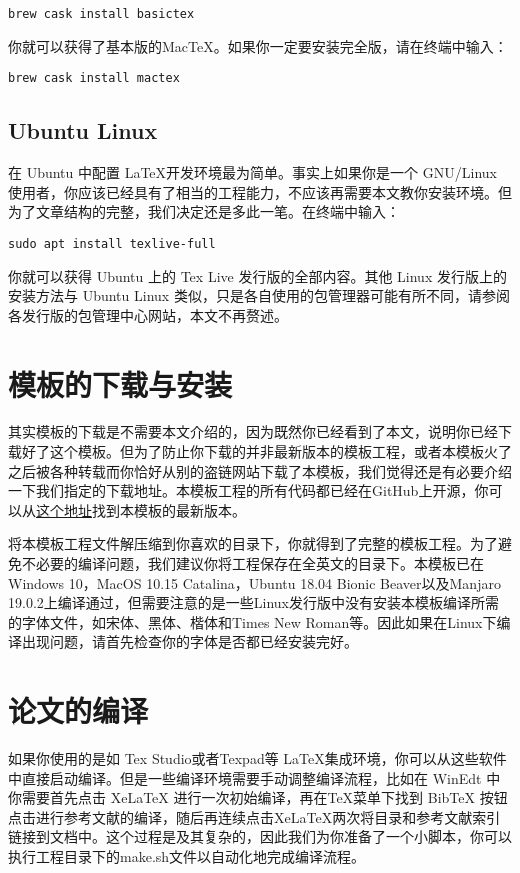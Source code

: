 \begin{tcolorbox}
\begin{lstlisting}
brew cask install basictex
\end{lstlisting}
\end{tcolorbox}

\noindent 你就可以获得了基本版的MacTeX。如果你一定要安装完全版，请在终端中输入：

\begin{tcolorbox}
\begin{lstlisting}
brew cask install mactex
\end{lstlisting}
\end{tcolorbox}

\subsection{Ubuntu Linux}

在 Ubuntu 中配置 \LaTeX 开发环境最为简单。事实上如果你是一个 GNU/Linux 使用者，你应该已经具有了相当的工程能力，不应该再需要本文教你安装环境。但为了文章结构的完整，我们决定还是多此一笔。在终端中输入：

\begin{tcolorbox}
\begin{lstlisting}
sudo apt install texlive-full
\end{lstlisting}
\end{tcolorbox}

\noindent 你就可以获得 Ubuntu 上的 Tex Live 发行版的全部内容。其他 Linux 发行版上的安装方法与 Ubuntu Linux 类似，只是各自使用的包管理器可能有所不同，请参阅各发行版的包管理中心网站，本文不再赘述。

\section{模板的下载与安装}
\label{sec:template_download}

其实模板的下载是不需要本文介绍的，因为既然你已经看到了本文，说明你已经下载好了这个模板。但为了防止你下载的并非最新版本的模板工程，或者本模板火了之后被各种转载而你恰好从别的盗链网站下载了本模板，我们觉得还是有必要介绍一下我们指定的下载地址。本模板工程的所有代码都已经在GitHub上开源，你可以从\href{https://github.com/herculas/SEU-master-thesis}{这个地址}找到本模板的最新版本。

将本模板工程文件解压缩到你喜欢的目录下，你就得到了完整的模板工程。为了避免不必要的编译问题，我们建议你将工程保存在全英文的目录下。本模板已在Windows 10，MacOS 10.15 Catalina，Ubuntu 18.04 Bionic Beaver以及Manjaro 19.0.2上编译通过，但需要注意的是一些Linux发行版中没有安装本模板编译所需的字体文件，如宋体、黑体、楷体和Times New Roman等。因此如果在Linux下编译出现问题，请首先检查你的字体是否都已经安装完好。

\section{论文的编译}
\label{sec:compilation}

如果你使用的是如 Tex Studio或者Texpad等 \LaTeX 集成环境，你可以从这些软件中直接启动编译。但是一些编译环境需要手动调整编译流程，比如在 WinEdt 中你需要首先点击 XeLaTeX 进行一次初始编译，再在TeX菜单下找到 BibTeX 按钮点击进行参考文献的编译，随后再连续点击XeLaTeX两次将目录和参考文献索引链接到文档中。这个过程是及其复杂的，因此我们为你准备了一个小脚本，你可以执行工程目录下的make.sh文件以自动化地完成编译流程。